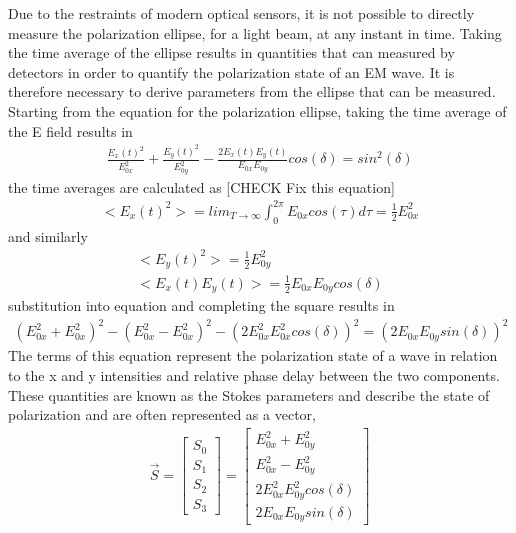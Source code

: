 Due to the restraints of modern optical sensors, it is not possible to directly measure the polarization ellipse, for a light beam, at any instant in time.  Taking the time average of the ellipse results in quantities that can measured by detectors in order to quantify the polarization state of an EM wave.  It is therefore necessary to derive parameters from the ellipse that can be measured.
Starting from the equation for the polarization ellipse, taking the time average of the E field results in
%
\begin{align}
    \frac{E_x (t)^2}{E_{0x}^2} + \frac{E_y (t)^2}{E_{0y}^2} - \frac{2 E_x (t) E_y (t)}{E_{0x} E_{0y} } cos(\delta)=sin^2 (\delta)
\end{align}
%
the time averages are calculated as [CHECK Fix this equation]
%
\begin{align}
    <E_x (t)^2> = lim_{T \rightarrow \infty} \int_{0}^{2\pi} E_{0x} cos(\tau)  d\tau=\frac{1}{2} E_{0x}^2
\end{align}
%
and similarly
%
\begin{align}
    <E_y (t)^2>  = \frac{1}{2} E_{0y}^2 \\
	<E_x (t) E_y (t)>  =  \frac{1}{2} E_{0x} E_{0y} cos(\delta)
\end{align}
%
substitution into equation and completing the square results in
%
\begin{align}
    (E_{0x}^2+E_{0x}^2 )^2-(E_{0x}^2-E_{0x}^2 )^2-(2E_{0x}^2 E_{0x}^2  cos(\delta) )^2=(2E_{0x} E_{0y}  sin(\delta))^2
\end{align}
%
The terms of this equation represent the polarization state of a wave in relation to the x and y intensities and relative phase delay between the two components.
These quantities are known as the Stokes parameters and describe the state of polarization and are often represented as a vector,
%
\begin{align}
    \vec{S} =
    \begin{bmatrix}
        S_0 \\
        S_1 \\
        S_2 \\
        S_3
    \end{bmatrix}
    =
    \begin{bmatrix}
        E_{0x}^2+E_{0y}^2 \\
        E_{0x}^2-E_{0y}^2 \\
        2E_{0x}^2 E_{0y}^2 cos(\delta) \\
        2E_{0x} E_{0y}  sin(\delta)
    \end{bmatrix}
\end{align}
